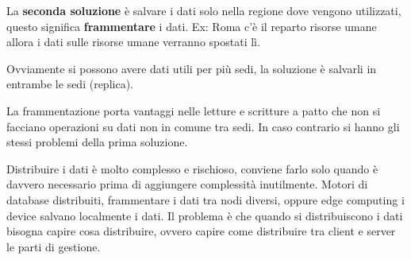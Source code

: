 La \textbf{seconda soluzione} è salvare i dati solo nella regione dove vengono
utilizzati, questo significa \textbf{frammentare} i dati. Ex: Roma c'è il
reparto risorse umane allora i dati sulle risorse umane verranno spostati lì.

Ovviamente si possono avere dati utili per più sedi, la soluzione è salvarli in
entrambe le sedi (replica).
\begin{nota}
    La frammentazione porta vantaggi nelle letture e scritture a patto che non
    si facciano operazioni su dati non in comune tra sedi. In caso contrario si
    hanno gli stessi problemi della prima soluzione.
\end{nota}
\begin{nota}
    Distribuire i dati è molto complesso e rischioso, conviene farlo solo quando
    è davvero necessario prima di aggiungere complessità inutilmente. Motori di
    database distribuiti, frammentare i dati tra nodi diversi, oppure edge
    computing i device salvano localmente i dati. Il problema è che quando si
    distribuiscono i dati bisogna capire cosa distribuire, ovvero capire come
    distribuire tra client e server le parti di gestione.
\end{nota}
